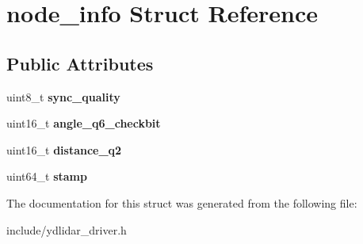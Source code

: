 \hypertarget{structnode__info}{}\section{node\+\_\+info Struct Reference}
\label{structnode__info}
\subsection*{Public Attributes}
\begin{DoxyCompactItemize}
\item 
uint8\+\_\+t {\bfseries sync\+\_\+quality}\hypertarget{structnode__info_a45f5ed4efbe416d43171d63c669f02da}{}\label{structnode__info_a45f5ed4efbe416d43171d63c669f02da}

\item 
uint16\+\_\+t {\bfseries angle\+\_\+q6\+\_\+checkbit}\hypertarget{structnode__info_a73e1d282a573f3daa74332fe29b90a26}{}\label{structnode__info_a73e1d282a573f3daa74332fe29b90a26}

\item 
uint16\+\_\+t {\bfseries distance\+\_\+q2}\hypertarget{structnode__info_a82eaf27a6196e803d3618c83b052f78c}{}\label{structnode__info_a82eaf27a6196e803d3618c83b052f78c}

\item 
uint64\+\_\+t {\bfseries stamp}\hypertarget{structnode__info_a92f30331da1d7d95f9998dcd3886574c}{}\label{structnode__info_a92f30331da1d7d95f9998dcd3886574c}

\end{DoxyCompactItemize}


The documentation for this struct was generated from the following file\+:\begin{DoxyCompactItemize}
\item 
include/ydlidar\+\_\+driver.\+h\end{DoxyCompactItemize}
